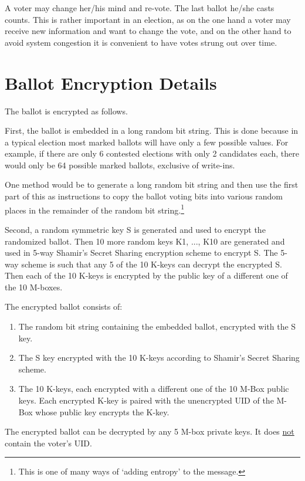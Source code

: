 \documentclass[12pt]{article}
\begin{document}
A voter may change her/his mind and re-vote.  The last ballot
he/she casts counts.  This is rather important in an election,
as on the one hand a voter may receive new information and
want to change the vote, and on the other hand to avoid system
congestion it is convenient to have votes strung out over time.

\section{Ballot Encryption Details}

The ballot is encrypted as follows.

First, the ballot is embedded in a long random bit string.
This is done because in a typical election most marked ballots will
have only a few possible values.  For example, if there are only
6 contested elections with only 2 candidates each, there would only
be 64 possible marked ballots, exclusive of write-ins.

One method would be to generate a long random bit string and then
use the first part of this as instructions to copy the ballot voting bits into
various random places in the remainder of the random bit string.\footnote{
This is one of many ways of `adding entropy' to the message.}

Second, a random symmetric key S is generated and used to encrypt
the randomized ballot.  Then 10 more random keys K1, ..., K10 are generated
and used in 5-way Shamir's Secret Sharing encryption
scheme to encrypt S.  The 5-way
scheme is such that any 5 of the 10 K-keys can decrypt the encrypted S.
Then each of the 10 K-keys is encrypted by the public key
of a different one of the 10 M-boxes.

The encrypted ballot consists of:
\begin{enumerate}
\item The random bit string containing the embedded ballot,
      encrypted with the S key.
\item The S key encrypted with the 10 K-keys according to
      Shamir's Secret Sharing scheme.
\item The 10 K-keys, each encrypted with a
      different one of the 10 M-Box public keys.
      Each encrypted K-key is paired with the unencrypted
      UID of the M-Box whose public key encrypts the K-key.
\end{enumerate}
The encrypted ballot can be decrypted
by any 5 M-box private keys.
It does \underline{not} contain the voter's UID.
\end{document}
